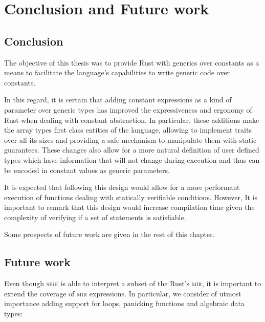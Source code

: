 \chapter{Conclusion and Future work}
\label{chap:conclusion}

\section{Conclusion}

The objective of this thesis was to provide Rust with generics over constants
as a means to facilitate the language's capabilities to write generic code over
constants.

In this regard, it is certain that adding constant expressions as a kind of
parameter over generic types has improved the expressiveness and ergonomy of
Rust when dealing with constant abstraction. In particular, these additions
make the array types first class entities of the language, allowing to
implement traits over all its sizes and providing a safe mechanism to
manipulate them with static guarantees. These changes also allow for a more
natural definition of user defined types which have information that will not
change during execution and thus can be encoded in constant values as generic
parameters.

It is expected that following this design would allow for a more performant
execution of functions dealing with statically verifiable conditions. However,
It is important to remark that this design would increase compilation time
given the complexity of verifying if a set of statements is satisfiable.

Some prospects of future work are given in the rest of this chapter.


\section{Future work}

Even though \textsc{sire} is able to interpret a subset of the Rust's
\textsc{mir}, it is important to extend the coverage of \textsc{mir}
expressions. In particular, we consider of utmost importance adding support for
loops, panicking functions and algebraic data types:


